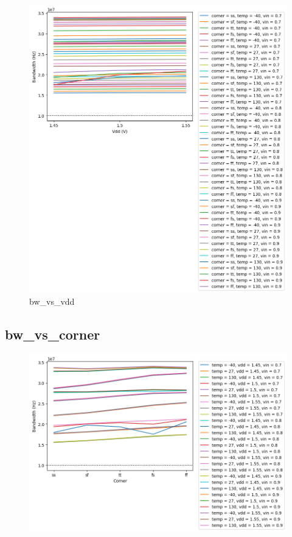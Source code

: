 \documentclass[
  a4paper,
  DIV=11,
  numbers=noendperiod]{scrartcl}
\begin{document}
\begin{tcolorbox}
\begin{figure}[H]
{\centering \includegraphics{./cace/_docs/ota-5t/schematic/bw_vs_vdd.png}

}

\caption{bw\_vs\_vdd}

\end{figure}%

\subsection{bw\_vs\_corner}\label{bw_vs_corner}

\begin{figure}[H]

{\centering \includegraphics{./cace/_docs/ota-5t/schematic/bw_vs_corner.png}

}
\end{figure}
\end{tcolorbox}
\end{document}
